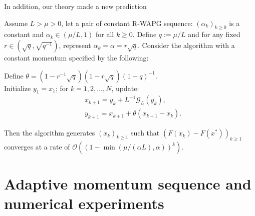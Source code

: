 \documentclass[11pt]{beamer}
\theoremstyle{definition}
\begin{document}
        \begin{frame}{In addition, our theory made a new prediction}
            \begin{theorem}\label{thm:fixed-momentum-fista}
                {\small
                Assume $L > \mu > 0$, let a pair of constant R-WAPG sequence: $(\alpha_k)_{k \ge0}$ is a constant and $\alpha_k \in (\mu/L, 1)$ for all $k \ge 0$.
                Define $q := \mu/L$ and for any fixed $r \in \left(\sqrt{q}, \sqrt{q^{-1}}\right)$, represent $\alpha_k = \alpha = r \sqrt{q}$. 
                Consider the algorithm with a constant momentum specified by the following:
                \begin{tcolorbox}
                    Define $\theta = \left(1 - r^{-1}\sqrt{q}\right)(1 - r\sqrt{q})(1 - q)^{-1}$.
                    \\
                    Initialize $y_1 = x_1$; for $k = 1, 2, \ldots, N$, update:
                    \begin{align*}
                        &x_{k + 1} = y_k + L^{-1}\mathcal G_L (y_k)
                        ,
                        \\
                        & y_{k + 1} = x_{k + 1} + \theta(x_{k + 1} - x_k).
                    \end{align*}
                \end{tcolorbox}
                Then the algorithm generates $(x_k)_{k \ge 1}$ such that $(F(x_{k}) - F(x^*))_{k\geq 1}$ converges at a rate of $\mathcal O\left(\left(1 - \min\left(\mu/(\alpha L), \alpha\right)\right)^k\right)$.
                }
            \end{theorem}
        \end{frame}
\section{Adaptive momentum sequence and numerical experiments}
\end{document}
